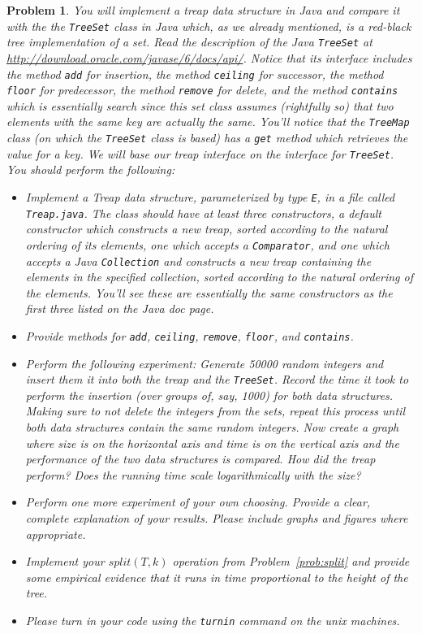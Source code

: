 \documentclass[11pt]{article}
\newtheorem{problem}{Problem}
\begin{document}
\begin{problem}
You will implement a treap data structure in Java and compare it with the the {\tt TreeSet} class in Java which, as we already mentioned, is a red-black tree implementation of a set.  Read the description of the Java {\tt TreeSet} at \url{http://download.oracle.com/javase/6/docs/api/}.  Notice that its interface includes the method {\tt add} for insertion, the method {\tt ceiling} for successor, the method {\tt floor} for predecessor, the method {\tt remove} for delete, and the method {\tt contains} which is essentially search since this set class assumes (rightfully so) that two elements with the same key are actually the same.  You'll notice that the {\tt TreeMap} class (on which the {\tt TreeSet} class is based) has a {\tt get} method which retrieves the {\em value} for a {\em key}.  We will base our treap interface on the interface for {\tt TreeSet}.  You should perform the following:  

\begin{itemize}
	\item Implement a Treap data structure, parameterized by type {\tt E},  in a file called {\tt Treap.java}.  The class should have at least three constructors, a default constructor which constructs a new treap, sorted according to the natural ordering of its elements, one which accepts a {\tt Comparator}, and one which accepts a Java {\tt Collection} and constructs a new treap containing the elements in the specified collection, sorted according to the natural ordering of the elements.  You'll see these are essentially the same constructors as the first three listed on the Java doc page.
	\item Provide methods for {\tt add}, {\tt ceiling}, {\tt remove}, {\tt floor}, and {\tt contains}.
	\item Perform the following experiment:  Generate 50000 random integers and insert them it into both the treap and the {\tt TreeSet}.  Record the time it took to perform the insertion (over groups of, say, 1000) for both data structures.  Making sure to not delete the integers from the sets, repeat this process until both data structures contain the same random integers.  Now create a graph where size is on the horizontal axis and time is on the vertical axis and the performance of the two data structures is compared.  How did the treap perform?  Does the running time scale logarithmically with the size?
	\item Perform one more experiment of your own choosing.  Provide a clear, complete explanation of your results.  Please include graphs and figures where appropriate.
	\item Implement your $split(T,k)$ operation from Problem~\ref{prob:split} and provide some empirical evidence that it runs in time proportional to the height of the tree.
	\item Please turn in your code using the {\tt turnin} command on the unix machines.
\end{itemize}
\end{problem}
\end{document}
